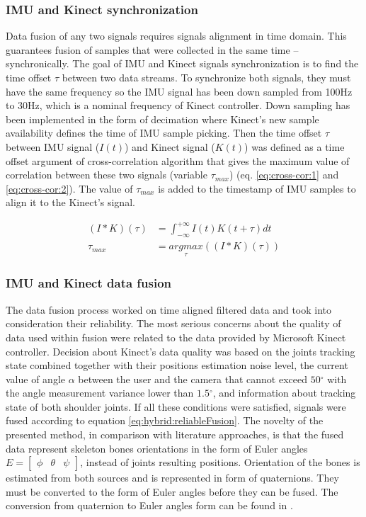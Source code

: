\documentclass[sensors,article,submit,moreauthors,pdftex,10pt,a4paper]{mdpi}
\newcommand{\degree}{\ensuremath{{}^{\circ}}\xspace}
\begin{document}
\subsubsection{IMU and Kinect synchronization}
Data fusion of any two signals requires signals alignment in time domain. This guarantees fusion of samples that were collected in the same time -- synchronically. The goal of IMU and Kinect signals synchronization is to find the time offset $\tau$ between two data streams. To synchronize both signals, they must have the same frequency so the IMU signal has been down sampled from 100Hz to 30Hz, which is a nominal frequency of Kinect controller. Down sampling has been implemented in the form of decimation where Kinect’s new sample availability defines the time of IMU sample picking. Then the time offset $\tau$ between IMU signal ($I(t)$) and Kinect signal ($K(t)$) was defined as a time offset argument of cross-correlation algorithm that gives the maximum value of correlation between these two signals (variable $\tau_{max}$) (eq. \ref{eq:cross-cor:1} and \ref{eq:cross-cor:2}). The value of $\tau_{max}$ is added to the timestamp of IMU samples to align it to the Kinect’s signal.

\begin{subequations}
	\begin{align}
		(I \ast K)(\tau) & = \int_{-\infty}^{+\infty}I(t)K(t+\tau)dt\label{eq:cross-cor:1}   \\
		\tau_{max}       & = \underset{\tau}{argmax}((I \ast K)(\tau))\label{eq:cross-cor:2} 
	\end{align}
	\label{eq:cross-cor}
\end{subequations}



\subsubsection{IMU and Kinect data fusion}
The data fusion process worked on time aligned filtered data and took into consideration their reliability. The most serious concerns about the quality of data used within fusion were related to the data provided by Microsoft Kinect controller. Decision about Kinect’s data quality was based on the joints tracking state combined together with their positions estimation noise level, the current value of angle $\alpha$ between the user and the camera that cannot exceed $50\degree$ with the angle measurement variance lower than $1.5\degree$, and information about tracking state of both shoulder joints. If all these conditions were satisfied, signals were fused according to equation \ref{eq:hybrid:reliableFusion}. The novelty of the presented method, in comparison with literature approaches, is that the fused data represent skeleton bones orientations in the form of Euler angles $E = \begin{bmatrix} \phi &  \theta & \psi \end{bmatrix}$, instead of joints resulting positions. Orientation of the bones is estimated from both sources and is represented in form of quaternions. They must be converted to the form of Euler angles before they can be fused. The conversion from quaternion to Euler angles form can be found in \cite{Dunn2011}.
\end{document}
